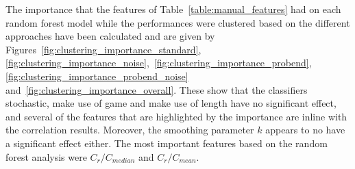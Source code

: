 \documentclass{article}
\begin{document}
The importance that the features of Table~\ref{table:manual_features} had on
each random forest model while the performances were clustered based on the
different approaches have been
calculated and are given by Figures~\ref{fig:clustering_importance_standard},
\ref{fig:clustering_importance_noise},~\ref{fig:clustering_importance_probend},
\ref{fig:clustering_importance_probend_noise}
and~\ref{fig:clustering_importance_overall}. These show that the classifiers
stochastic, make use of game and make use of length have no significant effect,
and several of the features that are highlighted by the importance are inline with
the correlation results. Moreover, the smoothing parameter \(k\) appears to no
have a significant effect either. The most important features based on the
random forest analysis were $C_{r} / C_{median}$ and $C_r / C_{mean}$.
\end{document}
